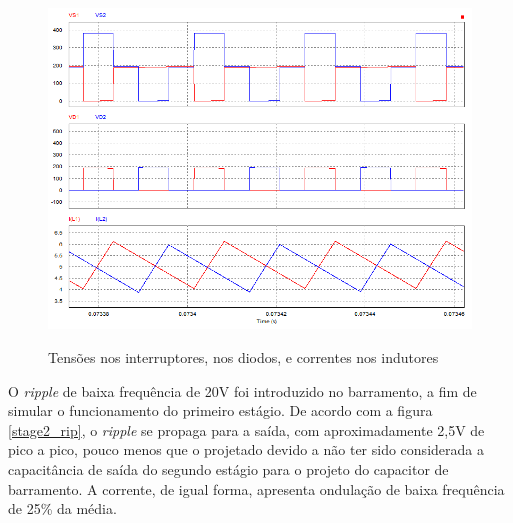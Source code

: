 \documentclass[
        12pt,
        openany, %
        oneside, %
        a4paper,			
        english,			
        brazil
        ]{abntbibufjf}
\begin{document}
\begin{figure}[!h]
	\centering
	\caption{Tensões nos interruptores, nos diodos, e correntes nos indutores}
	\includegraphics[scale=.5]{../GRAFICOS/stage2_hf.PNG}\\
	\label{stage2_hf}
\end{figure}

O \textit{ripple} de baixa frequência de 20V foi introduzido no barramento, a fim de simular o funcionamento do primeiro estágio. De acordo com a figura \ref{stage2_rip}, o \textit{ripple} se propaga para a saída, com aproximadamente 2,5V de pico a pico, pouco menos que o projetado devido a não ter sido considerada a capacitância de saída do segundo estágio para o projeto do capacitor de barramento. A corrente, de igual forma, apresenta ondulação de baixa frequência de 25\% da média. 
\end{document}
